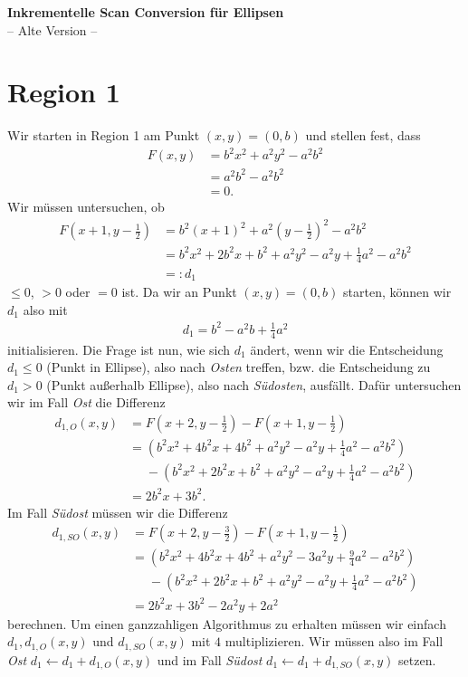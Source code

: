 \documentclass[12pt]{scrartcl}
\begin{document}
\begin{center}
  {\textbf{\Large Inkrementelle Scan Conversion für Ellipsen}\\ -- Alte Version --}\\ 
\end{center}
\medskip

\section*{Region 1}

Wir starten in Region 1 am Punkt $(x,y)=(0,b)$ und stellen fest, dass
\begin{align*} 
  F(x, y) & = b^2 x^2 + a^2 y^2 - a^2 b^2\\
          & = a^2 b^2 - a^2 b^2\\
          & = 0.
\end{align*}
Wir müssen untersuchen, ob
\begin{align*} 
  F(x+1, y-\frac{1}{2}) & = b^2 (x+1)^2 + a^2 (y-\frac{1}{2})^2 - a^2 b^2\\
                        & = b^2 x^2 + 2 b^2 x + b^2 + a^2 y^2 - a^2 y + \frac{1}{4} a^2 - a^2 b^2\\
                        & =: d_1
\end{align*}
$\leq 0$, $>0$ oder $=0$ ist. Da wir an Punkt $(x,y)=(0,b)$ starten, können wir $d_1$ also mit
\begin{align*}
  d_1 = b^2 - a^2 b + \frac{1}{4} a^2
\end{align*}
initialisieren.
Die Frage ist nun, wie sich $d_1$ ändert, wenn wir die Entscheidung $d_1 \leq 0$ (Punkt in Ellipse), also nach {\em Osten} treffen, bzw. die Entscheidung zu $d_1>0$ (Punkt außerhalb Ellipse), also nach {\em Südosten}, ausfällt.
Dafür untersuchen wir im Fall {\em Ost} die Differenz
\begin{align*}
  d_{1,O}(x,y) & = F(x+2,y-\frac{1}{2}) - F(x+1,y-\frac{1}{2})                           \\
               & =   (b^2 x^2 + 4 b^2 x + 4 b^2 + a^2 y^2 - a^2 y + \frac{1}{4} a^2 - a^2 b^2)\\
               & \phantom{=} - (b^2 x^2 + 2 b^2 x + b^2 + a^2 y^2 - a^2 y + \frac{1}{4} a^2 - a^2 b^2)\\
               & =   2 b^2 x + 3 b^2.
\end{align*}
Im Fall {\em Südost} müssen wir die Differenz
\begin{align*}
  d_{1,SO}(x,y) & = F(x+2,y-\frac{3}{2}) - F(x+1,y-\frac{1}{2})                           \\
                & =   (b^2 x^2 + 4 b^2 x + 4 b^2 + a^2 y^2 - 3 a^2 y + \frac{9}{4} a^2 - a^2 b^2)\\
                & \phantom{=} - (b^2 x^2 + 2 b^2 x + b^2 + a^2 y^2 - a^2 y + \frac{1}{4} a^2 - a^2 b^2)\\
                & =   2 b^2 x + 3 b^2 - 2 a^2 y + 2 a^2
\end{align*}
berechnen.
Um einen ganzzahligen Algorithmus zu erhalten müssen wir einfach $d_1, d_{1,O}(x,y)$ und $d_{1,SO}(x,y)$ mit $4$ multiplizieren.
Wir müssen also im Fall {\em Ost} $d_1 \leftarrow d_1 + d_{1,O}(x,y)$ und im Fall {\em Südost} $d_1 \leftarrow d_1 + d_{1,SO}(x,y)$ setzen.
\end{document}
